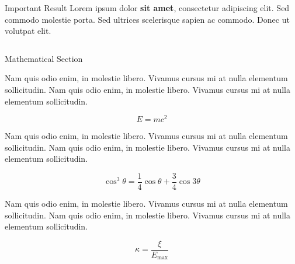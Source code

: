 \documentclass[final]{beamer}
\newlength{\onecolwid}
\newlength{\twocolwid}
\begin{document}
\begin{frame}[t]
\begin{columns}[t]
\begin{column}{\twocolwid}
\begin{alertblock}{Important Result}
        Lorem ipsum dolor \textbf{sit amet}, consectetur adipiscing elit. Sed commodo molestie porta. Sed ultrices scelerisque sapien ac commodo. Donec ut volutpat elit.

      \end{alertblock}


      \begin{columns}[t,totalwidth=\twocolwid] %

        \begin{column}{\onecolwid} %


          \begin{block}{Mathematical Section}

            Nam quis odio enim, in molestie libero. Vivamus cursus mi at nulla elementum sollicitudin. Nam quis odio enim, in molestie libero. Vivamus cursus mi at nulla elementum sollicitudin.

            \begin{equation}
              E = mc^{2}
              \label{eqn:Einstein}
            \end{equation}

            Nam quis odio enim, in molestie libero. Vivamus cursus mi at nulla elementum sollicitudin. Nam quis odio enim, in molestie libero. Vivamus cursus mi at nulla elementum sollicitudin.

            \begin{equation}
              \cos^3 \theta =\frac{1}{4}\cos\theta+\frac{3}{4}\cos 3\theta
              \label{eq:refname}
            \end{equation}

            Nam quis odio enim, in molestie libero. Vivamus cursus mi at nulla elementum sollicitudin. Nam quis odio enim, in molestie libero. Vivamus cursus mi at nulla elementum sollicitudin.

            \begin{equation}
              \kappa =\frac{\xi}{E_{\mathrm{max}}} %
            \end{equation}


\end{block}
\end{column}
\end{columns}
\end{column}
\end{columns}
\end{frame}
\end{document}
